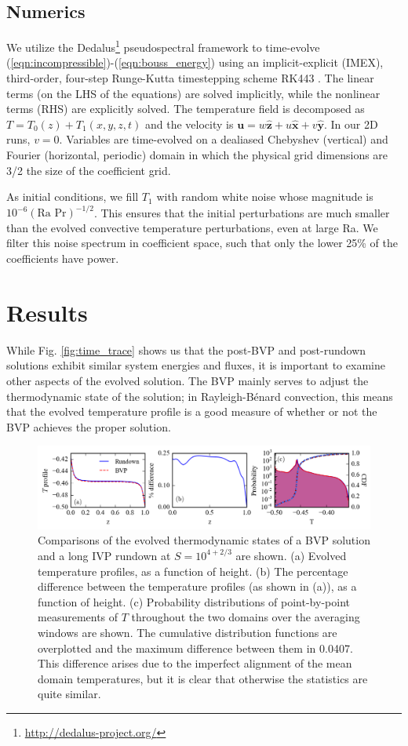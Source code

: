 \documentclass[aps, pre, onecolumn, nofootinbib, notitlepage, groupedaddress, amsfonts, amssymb, amsmath, longbibliography]{revtex4-1}
\newcommand{\RB}{Rayleigh-B\'{e}nard }
\begin{document}
\subsection{Numerics}
We utilize the 
Dedalus\footnote{\url{http://dedalus-project.org/}} 
pseudospectral framework \cite{burns&all2016} to time-evolve  
(\ref{eqn:incompressible})-(\ref{eqn:bouss_energy}) 
using an implicit-explicit (IMEX), third-order, four-step 
Runge-Kutta timestepping scheme RK443 \cite{ascher&all1997}.  
The linear terms (on the LHS of the equations) are solved implicitly,
while the nonlinear terms (RHS) are explicitly solved.
The temperature field is decomposed as $T = T_0(z) + T_1(x, y, z, t)$
and the velocity is $\bm{u} = w\bm{\hat{z}} + u\bm{\hat{x}} + v\bm{\hat{y}}$.
In our 2D runs, $v = 0$.
Variables are time-evolved on a dealiased Chebyshev (vertical)
and Fourier (horizontal, periodic) domain in which the
physical grid dimensions are 3/2 the size of the coefficient grid.  

As initial conditions, we fill $T_1$ with
random white noise whose magnitude is $10^{-6}(\text{Ra Pr})^{-1/2}$.
This ensures that the initial perturbations are much smaller than the
evolved convective temperature perturbations, even at large Ra.
We filter this noise spectrum in coefficient space, 
such that only the lower 25\% of the coefficients
have power.

\section{Results}
While Fig. \ref{fig:time_trace} shows us that the post-BVP and post-rundown solutions
exhibit similar system energies and fluxes, it is important to examine other aspects of
the evolved solution. The BVP mainly serves to adjust the thermodynamic state of the solution;
in \RB convection, this means that the evolved temperature profile is a good measure of whether
or not the BVP achieves the proper solution.

\begin{figure}[t]
\includegraphics[width=\textwidth]{./figs/temp_comparison.png}
\caption{Comparisons of the evolved thermodynamic states of a BVP solution and a long IVP rundown at
$S = 10^{4 + 2/3}$ are shown.  (a) Evolved temperature profiles, as a function of height.
(b) The percentage difference between the temperature profiles (as shown in (a)), as a function of height.
(c) Probability distributions of point-by-point measurements of $T$ throughout the two domains over the
averaging windows are shown.  The cumulative distribution functions are overplotted and the maximum
difference between them in 0.0407. This difference arises due to the imperfect alignment of the
mean domain temperatures, but it is clear that otherwise the statistics are quite similar.
\label{fig:temp_comparison} }
\end{figure}
\end{document}
